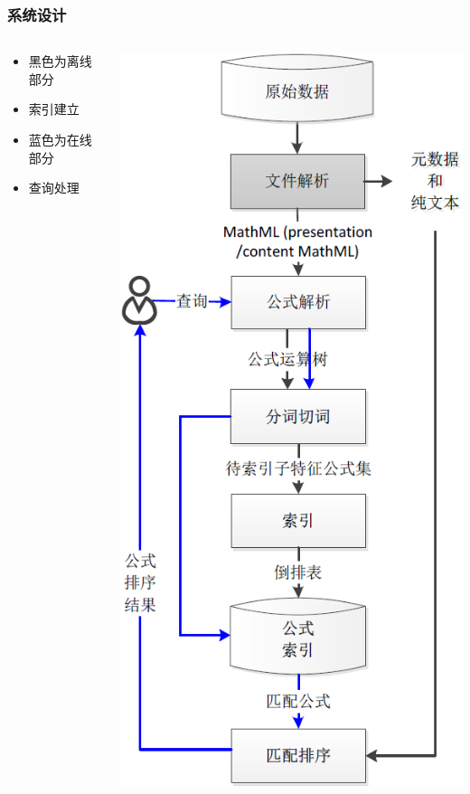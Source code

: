     \begin{frame}
        \frametitle{系统设计}
        \vspace{-5cm}
        \begin{columns}
                \begin{center}
                    \begin{itemize}
                        \item 黑色为离线部分
                        \item[] 索引建立
                        \item 蓝色为在线部分
                        \item[] 查询处理
                    \end{itemize}
                \end{center}
                \includegraphics[height=0.8\textheight]{pic/process.png}
        \end{columns}
    \end{frame}


